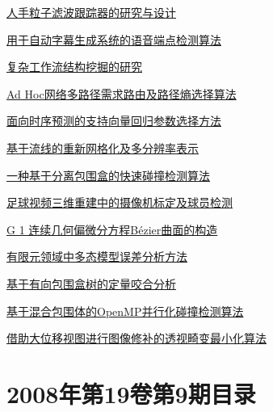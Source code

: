 \documentclass[a4paper]{article}
\begin{document}
\href{http://www.jos.org.cn/ch/reader/download_pdf.aspx?file_no=2008s110&year_id=2008&quarter_id=zk&falg=1}{人手粒子滤波跟踪器的研究与设计}

\href{http://www.jos.org.cn/ch/reader/download_pdf.aspx?file_no=2008s111&year_id=2008&quarter_id=zk&falg=1}{用于自动字幕生成系统的语音端点检测算法}

\href{http://www.jos.org.cn/ch/reader/download_pdf.aspx?file_no=2008s112&year_id=2008&quarter_id=zk&falg=1}{复杂工作流结构挖掘的研究}

\href{http://www.jos.org.cn/ch/reader/download_pdf.aspx?file_no=2008s113&year_id=2008&quarter_id=zk&falg=1}{Ad Hoc网络多路径需求路由及路径熵选择算法}

\href{http://www.jos.org.cn/ch/reader/download_pdf.aspx?file_no=2008s114&year_id=2008&quarter_id=zk&falg=1}{面向时序预测的支持向量回归参数选择方法}

\href{http://www.jos.org.cn/ch/reader/download_pdf.aspx?file_no=2008s115&year_id=2008&quarter_id=zk&falg=1}{基于流线的重新网格化及多分辨率表示}

\href{http://www.jos.org.cn/ch/reader/download_pdf.aspx?file_no=2008s116&year_id=2008&quarter_id=zk&falg=1}{一种基于分离包围盒的快速碰撞检测算法}

\href{http://www.jos.org.cn/ch/reader/download_pdf.aspx?file_no=2008s117&year_id=2008&quarter_id=zk&falg=1}{足球视频三维重建中的摄像机标定及球员检测}

\href{http://www.jos.org.cn/ch/reader/download_pdf.aspx?file_no=2008s118&year_id=2008&quarter_id=zk&falg=1}{G 1 连续几何偏微分方程Bézier曲面的构造}

\href{http://www.jos.org.cn/ch/reader/download_pdf.aspx?file_no=2008s119&year_id=2008&quarter_id=zk&falg=1}{有限元领域中多态模型误差分析方法}

\href{http://www.jos.org.cn/ch/reader/download_pdf.aspx?file_no=2008s120&year_id=2008&quarter_id=zk&falg=1}{基于有向包围盒树的定量咬合分析}

\href{http://www.jos.org.cn/ch/reader/download_pdf.aspx?file_no=2008s121&year_id=2008&quarter_id=zk&falg=1}{基于混合包围体的OpenMP并行化碰撞检测算法}

\href{http://www.jos.org.cn/ch/reader/download_pdf.aspx?file_no=2008s122&year_id=2008&quarter_id=zk&falg=1}{借助大位移视图进行图像修补的透视畸变最小化算法}


\section{\textbf{2008年第19卷第9期目录}}
\end{document}

